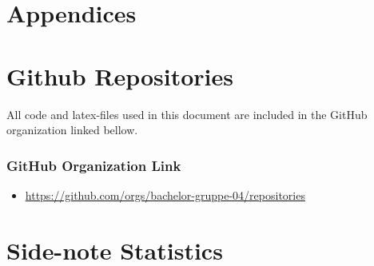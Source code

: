 \chapter*{\LARGE Appendices}

\appendix

\chapter{Github Repositories}

All code and latex-files used in this document are included in the GitHub organization linked bellow.

\subsection*{GitHub Organization Link}

\begin{itemize}
    \item \url{https://github.com/orgs/bachelor-gruppe-04/repositories}
\end{itemize}

\chapter{Side-note Statistics}

